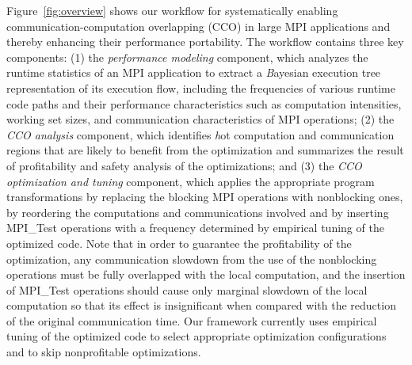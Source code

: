 Figure~\ref{fig:overview} shows our workflow for systematically enabling communication-computation overlapping (CCO) in large MPI
applications and thereby enhancing their performance portability.
The workflow contains three key components:  (1) the \emph{performance modeling} component,
which analyzes the runtime statistics of an MPI application to extract a {\emph Bayesian execution tree\cite{jichi:ipdps14}} representation of
its execution flow, including the frequencies of various runtime code paths and their performance characteristics such as computation intensities,
working set sizes, and  communication characteristics of MPI operations;
(2) the \emph{CCO analysis} component, which identifies {\emph hot} computation and communication regions
 that are likely to benefit from the optimization and  summarizes the result of profitability and safety analysis of the optimizations;
and (3) the \emph{CCO optimization and tuning} component, which applies the appropriate program transformations by replacing the blocking MPI operations with
nonblocking ones, by reordering the computations and communications involved and
  by inserting MPI\_Test operations with a frequency determined by empirical tuning of the optimized code.
Note that in order to guarantee the profitability of the optimization,
any communication slowdown from the use of the nonblocking operations must be fully overlapped with the local computation,
and the insertion of MPI\_Test operations should cause only marginal slowdown of the local computation so that its effect is
insignificant when compared with the reduction of the original communication time.
Our framework currently uses empirical tuning of the optimized code to select appropriate optimization configurations and to skip nonprofitable optimizations.

